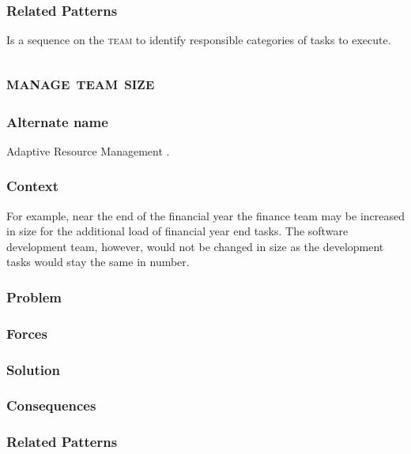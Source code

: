 \documentclass[prodmode]{style/acmlarge}
\begin{document}
\subsubsection*{Related Patterns} Is a sequence on the \textsc{team} to identify
responsible categories of tasks to execute.



\subsection{\textsc{\textbf{manage team size}}}

\subsubsection*{Alternate name} Adaptive Resource Management \cite{seda}. 

\subsubsection*{Context} 

For example, near the end of the financial year the finance
team may be increased in size for the additional load of financial year end
tasks.  The software development team, however, would not be changed in size as
the development tasks would stay the same in number.

\subsubsection*{Problem}

\subsubsection*{Forces} 

\subsubsection*{Solution}

\subsubsection*{Consequences}

\subsubsection*{Related Patterns}
\end{document}
